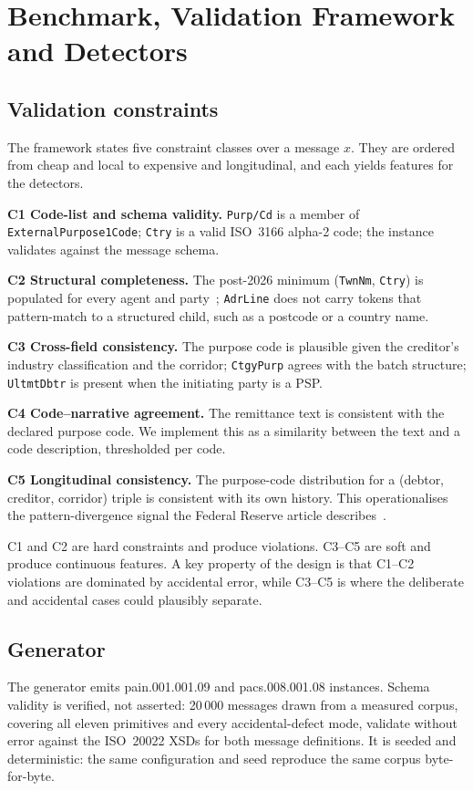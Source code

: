 \documentclass[conference]{IEEEtran}
\begin{document}
\section{Benchmark, Validation Framework and Detectors}
\label{sec:bench}

\subsection{Validation constraints}
The framework states five constraint classes over a message $x$. They are
ordered from cheap and local to expensive and longitudinal, and each yields
features for the detectors.

\textbf{C1 Code-list and schema validity.} \texttt{Purp/Cd} is a member of
\texttt{ExternalPurpose1Code}; \texttt{Ctry} is a valid ISO~3166 alpha-2
code; the instance validates against the message schema.

\textbf{C2 Structural completeness.} The post-2026 minimum
(\texttt{TwnNm}, \texttt{Ctry}) is populated for every agent and
party~\cite{swift2026addr,cpmi2026}; \texttt{AdrLine} does not carry tokens
that pattern-match to a structured child, such as a postcode or a country
name.

\textbf{C3 Cross-field consistency.} The purpose code is plausible given the
creditor's industry classification and the corridor; \texttt{CtgyPurp} agrees
with the batch structure; \texttt{UltmtDbtr} is present when the initiating
party is a PSP.

\textbf{C4 Code--narrative agreement.} The remittance text is consistent with
the declared purpose code. We implement this as a similarity between the text
and a code description, thresholded per code.

\textbf{C5 Longitudinal consistency.} The purpose-code distribution for a
(debtor, creditor, corridor) triple is consistent with its own history. This
operationalises the pattern-divergence signal the Federal Reserve article
describes~\cite{frb2026}.

C1 and C2 are hard constraints and produce violations. C3--C5 are soft and
produce continuous features. A key property of the design is that C1--C2
violations are dominated by accidental error, while C3--C5 is where the
deliberate and accidental cases could plausibly separate.

\subsection{Generator}
The generator emits pain.001.001.09 and pacs.008.001.08 instances. Schema
validity is verified, not asserted: 20\,000 messages drawn from a measured
corpus, covering all eleven primitives and every accidental-defect mode,
validate without error against the ISO~20022 XSDs for both message
definitions. It is seeded and deterministic: the same configuration and seed
reproduce the same corpus byte-for-byte.
\end{document}
